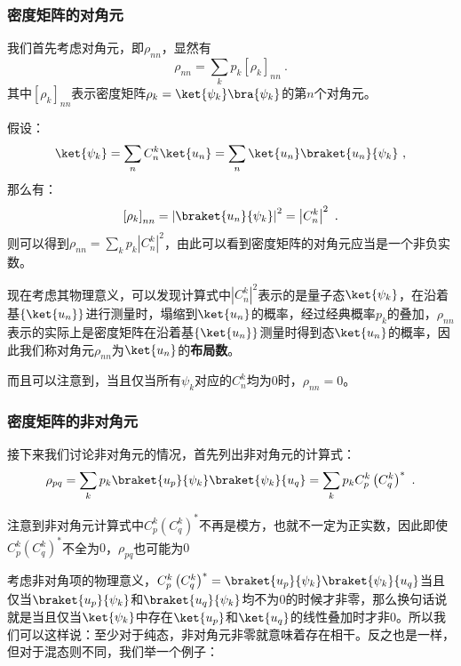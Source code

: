 \subsubsection{密度矩阵的对角元}

我们首先考虑对角元，即$\rho_{nn}$，显然有
$$\rho_{nn} = \sum\limits_{k} p_k \left[\rho_k\right]_{nn}~.$$
其中$\left[\rho_k\right]_{nn}$表示密度矩阵$\rho_k = \ket{\psi_k}\bra{\psi_k}$的第$n$个对角元。

假设：
$$\ket{\psi_k} = \sum\limits_n C_n^{k}\ket{u_n} = \sum\limits_n\ket{u_n}\braket{u_n}{\psi_k}~,$$
那么有：
$$\left[\rho_k\right]_{nn} = \left|\braket{u_n}{\psi_k}\right|^2 = \left| C_n^{k}\right|^2~.$$
则可以得到$\rho_{nn} = \sum\limits_k p_k \left|C_n^k\right|^2$，由此可以看到密度矩阵的对角元应当是一个非负实数。

现在考虑其物理意义，可以发现计算式中$\left| C_n^k \right|^2$表示的是量子态$\ket{\psi_k}$，在沿着基$\left\{\ket{u_n}\right\}$进行测量时，塌缩到$\ket{u_n}$的概率，经过经典概率$p_k$的叠加，$\rho_{nn}$表示的实际上是密度矩阵在沿着基$\left\{\ket{u_n}\right\}$测量时得到态$\ket{u_n}$的概率，因此我们称对角元$\rho_{nn}$为$\ket{u_n}$的\textbf{布局数}。

而且可以注意到，当且仅当所有$\psi_k$对应的$C_n^k$均为$0$时，$\rho_{nn} = 0$。

\subsubsection{密度矩阵的非对角元}

接下来我们讨论非对角元的情况，首先列出非对角元的计算式：
$$\rho_{pq} = \sum\limits_k p_k \braket{u_p}{\psi_k}\braket{\psi_k}{u_q} = \sum\limits_k p_k C_p^k \left(C_q^k\right)^*~.$$

注意到非对角元计算式中$C_p^k\left(C_q^k\right)^*$不再是模方，也就不一定为正实数，因此即使$C_p^k \left(C_q^k\right)^*$不全为$0$，$\rho_{pq}$也可能为$0$

考虑非对角项的物理意义，$C_p^k\left(C_q^k\right)^* = \braket{u_p}{\psi_k}\braket{\psi_k}{u_q}$当且仅当$\braket{u_p}{\psi_k}$和$\braket{u_q}{\psi_k}$均不为$0$的时候才非零，那么换句话说就是当且仅当$\ket{\psi_k}$中存在$\ket{u_p}$和$\ket{u_q}$的线性叠加时才非$0$。所以我们可以这样说：至少对于纯态，非对角元非零就意味着存在相干。反之也是一样，但对于混态则不同，我们举一个例子：

